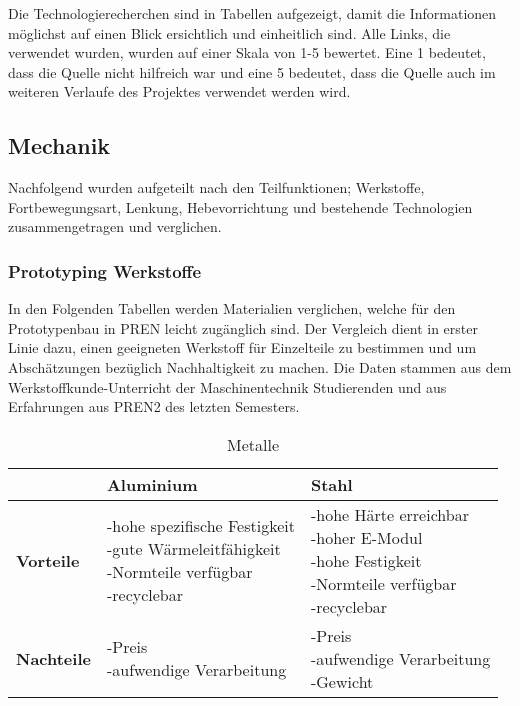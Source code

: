 Die Technologierecherchen sind in Tabellen aufgezeigt, damit die Informationen möglichst auf einen Blick ersichtlich und einheitlich sind. Alle Links, die verwendet wurden, wurden auf einer Skala von 1-5 bewertet. Eine 1 bedeutet, dass die Quelle nicht hilfreich war und eine 5 bedeutet, dass die Quelle auch im weiteren Verlaufe des Projektes verwendet werden wird.

\subsection{Mechanik}

Nachfolgend wurden aufgeteilt nach den Teilfunktionen; Werkstoffe, Fortbewegungsart, Lenkung, Hebevorrichtung und bestehende Technologien zusammengetragen und verglichen.

\subsubsection{Prototyping Werkstoffe}

In den Folgenden Tabellen werden Materialien verglichen, welche für den Prototypenbau in PREN leicht zugänglich sind. Der Vergleich dient in erster Linie dazu, einen geeigneten Werkstoff für Einzelteile zu bestimmen und um Abschätzungen bezüglich Nachhaltigkeit zu machen. Die Daten stammen aus dem Werkstoffkunde-Unterricht der Maschinentechnik Studierenden und aus Erfahrungen aus PREN2 des letzten Semesters.

\begin{table}[H]
\centering
\small
\begin{tabularx}{\textwidth}{|l|X|X|}
\hline
  \textbf{} & \textbf{Aluminium} & \textbf{Stahl} \\
  \hline
  \textbf{Vorteile}  & \makecell{-hohe spezifische Festigkeit\\ -gute Wärmeleitfähigkeit \\ -Normteile verfügbar \\ -recyclebar} & \makecell{-hohe Härte erreichbar \\-hoher E-Modul\\-hohe Festigkeit \\ -Normteile verfügbar\\ -recyclebar}\\ 
  \hline
  \textbf{Nachteile} & \makecell{-Preis \\ -aufwendige Verarbeitung \\} & \makecell{-Preis\\-aufwendige Verarbeitung \\ -Gewicht}\\
  \hline
\end{tabularx}
\caption{Metalle}
\label{table:metals-comparison}
\end{table}


